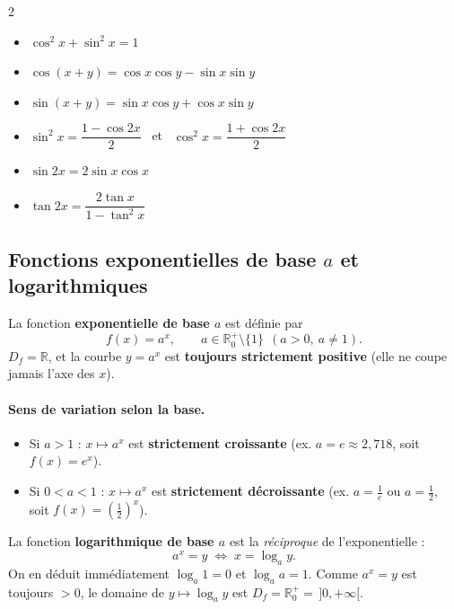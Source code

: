 \documentclass[11pt,a4paper]{article}
\newcommand{\R}{\mathbb{R}}
\newcommand{\Df}{D_f}
\begin{document}
\begin{tcolorbox}[boxbase,colback=primary!6,colframe=primary,
    title={\textsc{Formulaire trigonométrique}}]
\begin{multicols}{2}
\begin{itemize}[leftmargin=1.2em,topsep=0pt,itemsep=3pt]
  \item $\cos^2 x+\sin^2 x=1$
  \item $\cos(x+y)=\cos x\cos y-\sin x\sin y$
  \item $\sin(x+y)=\sin x\cos y+\cos x\sin y$
  \item $\sin^2 x=\dfrac{1-\cos 2x}{2}$ \ et \ $\cos^2 x=\dfrac{1+\cos 2x}{2}$
  \item $\sin 2x=2\sin x\cos x$
  \item $\tan 2x=\dfrac{2\tan x}{1-\tan^2 x}$
\end{itemize}
\end{multicols}
\end{tcolorbox}

\subsection{Fonctions exponentielles de base $a$ et logarithmiques}

\begin{definition}
La fonction \textbf{exponentielle de base $a$} est définie par
\[
  f(x)=a^{x},\qquad a\in\R_0^{+}\setminus\{1\}\ \ (a>0,\ a\neq 1).
\]
$\Df=\R$, et la courbe $y=a^x$ est \textbf{toujours strictement positive}
(elle ne coupe jamais l'axe des $x$).
\end{definition}

\paragraph{Sens de variation selon la base.}
\begin{itemize}[leftmargin=1.5em,topsep=2pt,itemsep=2pt]
  \item Si $a>1$ : $x\mapsto a^x$ est \textbf{strictement croissante}
        (ex. $a=e\approx 2{,}718$, soit $f(x)=e^x$).
  \item Si $0<a<1$ : $x\mapsto a^x$ est \textbf{strictement décroissante}
        (ex. $a=\frac1e$ ou $a=\frac12$, soit $f(x)=\left(\frac12\right)^x$).
\end{itemize}

\begin{definition}
La fonction \textbf{logarithmique de base $a$} est la \emph{réciproque} de l'exponentielle :
\[
  a^{x}=y \;\Longleftrightarrow\; x=\log_a y .
\]
On en déduit immédiatement $\log_a 1=0$ et $\log_a a=1$. Comme $a^x=y$ est toujours
$>0$, le domaine de $y\mapsto\log_a y$ est $\Df=\R_0^{+}=\,]0,+\infty[$.
\end{definition}
\end{document}
